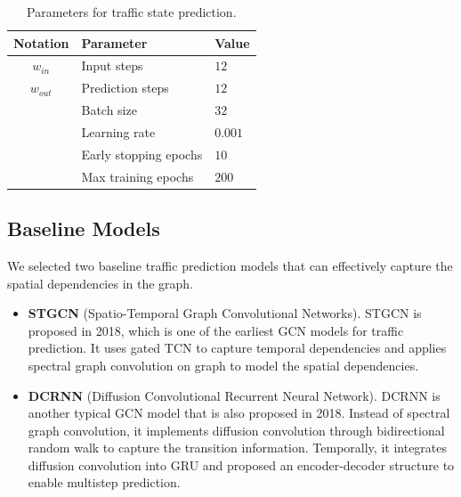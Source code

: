 \begin{table}[htb]
    \begin{center}
        \caption{Parameters for traffic state prediction.}
        \label{traff_pred_params}
        \begin{tabular}{cll}
            \toprule
  
            \textbf{Notation} & \textbf{Parameter} & \textbf{Value}\\
  
            \midrule
  
            $w_{in}$ & Input steps & $12$\\
            $w_{out}$ & Prediction steps & $12$\\
            ~ & Batch size & $32$\\
            ~ & Learning rate & $0.001$\\
            ~ & Early stopping epochs & $10$\\
            ~ & Max training epochs & $200$\\
  
            \bottomrule
        \end{tabular}
    \end{center}
\end{table}

\subsection{Baseline Models}
We selected two baseline traffic prediction models that can effectively capture the spatial dependencies in the graph.

\begin{itemize}
    \item \textbf{STGCN}\cite{STGCN} (Spatio-Temporal Graph Convolutional Networks). STGCN is proposed in 2018, which is one of the earliest GCN models for traffic prediction. It uses gated TCN\cite{TCN} to capture temporal dependencies and applies spectral graph convolution\cite{GCN0} on graph to model the spatial dependencies.
    \item \textbf{DCRNN}\cite{DCRNN} (Diffusion Convolutional Recurrent Neural Network). DCRNN is another typical GCN model that is also proposed in 2018. Instead of spectral graph convolution, it implements diffusion convolution through bidirectional random walk to capture the transition information. Temporally, it integrates diffusion convolution into GRU and proposed an encoder-decoder structure to enable multistep prediction.
\end{itemize}

